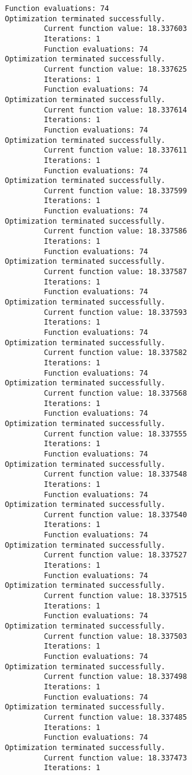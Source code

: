 \documentclass[11pt]{article}
\begin{document}
\begin{Verbatim}[commandchars=\\\{\}]
         Function evaluations: 74
Optimization terminated successfully.
         Current function value: 18.337603
         Iterations: 1
         Function evaluations: 74
Optimization terminated successfully.
         Current function value: 18.337625
         Iterations: 1
         Function evaluations: 74
Optimization terminated successfully.
         Current function value: 18.337614
         Iterations: 1
         Function evaluations: 74
Optimization terminated successfully.
         Current function value: 18.337611
         Iterations: 1
         Function evaluations: 74
Optimization terminated successfully.
         Current function value: 18.337599
         Iterations: 1
         Function evaluations: 74
Optimization terminated successfully.
         Current function value: 18.337586
         Iterations: 1
         Function evaluations: 74
Optimization terminated successfully.
         Current function value: 18.337587
         Iterations: 1
         Function evaluations: 74
Optimization terminated successfully.
         Current function value: 18.337593
         Iterations: 1
         Function evaluations: 74
Optimization terminated successfully.
         Current function value: 18.337582
         Iterations: 1
         Function evaluations: 74
Optimization terminated successfully.
         Current function value: 18.337568
         Iterations: 1
         Function evaluations: 74
Optimization terminated successfully.
         Current function value: 18.337555
         Iterations: 1
         Function evaluations: 74
Optimization terminated successfully.
         Current function value: 18.337548
         Iterations: 1
         Function evaluations: 74
Optimization terminated successfully.
         Current function value: 18.337540
         Iterations: 1
         Function evaluations: 74
Optimization terminated successfully.
         Current function value: 18.337527
         Iterations: 1
         Function evaluations: 74
Optimization terminated successfully.
         Current function value: 18.337515
         Iterations: 1
         Function evaluations: 74
Optimization terminated successfully.
         Current function value: 18.337503
         Iterations: 1
         Function evaluations: 74
Optimization terminated successfully.
         Current function value: 18.337498
         Iterations: 1
         Function evaluations: 74
Optimization terminated successfully.
         Current function value: 18.337485
         Iterations: 1
         Function evaluations: 74
Optimization terminated successfully.
         Current function value: 18.337473
         Iterations: 1

\end{Verbatim}
\end{document}
